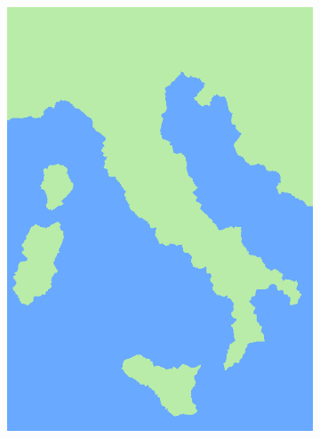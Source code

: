 \documentclass{beamer}
\begin{document}
\begin{frame}
    
\begin{figure}
    \centering
        \begin{subfigure}[b]{0.4\textwidth}
        \centering
            \includegraphics[width=\textwidth]{images/italy4.png}
    

\end{subfigure}
\end{figure}
\end{frame}
\end{document}
